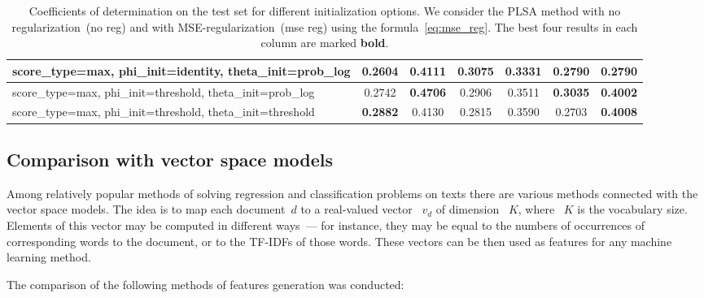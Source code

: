 \documentclass{sig-alternate-2013}
\begin{document}
\begin{table*}
\begin{tabular}{|m{4cm}|c|c|c|c|c|c|}
        score\_type=max, phi\_init=identity, theta\_init=prob\_log & 0.2604 & 0.4111 & \textbf{0.3075} & 0.3331 & \textbf{0.2790} & 0.2790 \\ \hline
        score\_type=max, phi\_init=threshold, theta\_init=prob\_log & 0.2742 & \textbf{0.4706} & 0.2906 & 0.3511 & \textbf{0.3035} & \textbf{0.4002} \\ \hline
        score\_type=max, phi\_init=threshold, theta\_init=threshold & \textbf{0.2882} & 0.4130 & 0.2815 & 0.3590 & 0.2703 & \textbf{0.4008} \\ \hline
    \end{tabular}
    \caption{Coefficients of determination on the test set for different initialization options.
        We consider the PLSA method with no regularization~(no reg) and with MSE-regularization~(mse reg) using the formula~\eqref{eq:mse_reg}.
        The best four results in each column are marked \textbf{bold}.}
    \label{tbl:init_res}
\end{table*}


\subsection{Comparison with vector space models}

Among relatively popular methods of solving regression and classification problems on texts there are various methods connected with the vector space models. The idea is to map each document~$d$ to a real-valued vector ~$v_d$ of dimension ~$K$, where ~$K$ is the vocabulary size. Elements of this vector may be computed in different ways~--- for instance, they may be equal to the numbers of occurrences of corresponding words to the document, or to the TF-IDFs of those words. These vectors can be then used as features for any machine learning method.

The comparison of the following methods of features generation was conducted:
\end{document}
